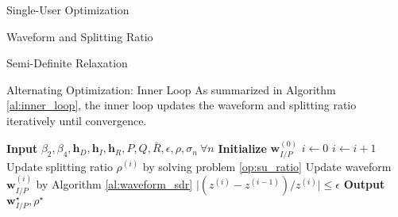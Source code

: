\documentclass{IEEEtran}
\begin{document}
\begin{section}{Single-User Optimization}
\begin{subsection}{Waveform and Splitting Ratio}
\begin{subsubsection}{Semi-Definite Relaxation}
			\begin{paragraph}{Alternating Optimization: Inner Loop}
				As summarized in Algorithm \ref{al:inner_loop}, the inner loop updates the waveform and splitting ratio iteratively until convergence.
				\begin{algorithm}
					\caption{Inner Loop: Waveform and Splitting Ratio}
					\label{al:inner_loop}
					\begin{algorithmic}[1]
						\State \textbf{Input} $\beta_2,\beta_4,\boldsymbol{h}_D,\boldsymbol{h}_I,\boldsymbol{h}_R,P,Q,\bar{R},\epsilon,\rho,\sigma_n \ \forall n$
						\State \textbf{Initialize} $\boldsymbol{w}_{I/P}^{(0)}$
						\State $i \gets 0$
						\Repeat
						\State $i \gets i + 1$
						\State Update splitting ratio $\rho^{(i)}$ by solving problem \ref{op:su_ratio}
						\State Update waveform $\boldsymbol{w}_{I/P}^{(i)}$ by Algorithm \ref{al:waveform_sdr}
						\Until $\lvert (z^{(i)}-z^{(i-1)}) / z^{(i)} \rvert \le \epsilon$
						\State \textbf{Output} $\boldsymbol{w}_{I/P}^{\star}, \rho^{\star}$
					\end{algorithmic}
				\end{algorithm}
			\end{paragraph}
		\end{subsubsection}
	\end{subsection}


\end{section}
\end{document}
